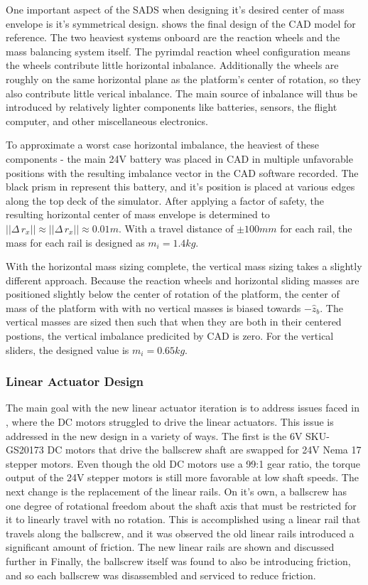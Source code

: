 One important aspect of the SADS when designing it's desired center of mass envelope is it's symmetrical design.  shows the final design of the CAD model for reference. The two heaviest systems onboard are the reaction wheels and the mass balancing system itself. The pyrimdal reaction wheel configuration means the wheels contribute little horizontal inbalance. Additionally the wheels are roughly on the same horizontal plane as the platform's center of rotation, so they also contribute little verical inbalance. The main source of inbalance will thus be introduced by relatively lighter components like batteries, sensors, the flight computer, and other miscellaneous electronics.

To approximate a worst case horizontal imbalance, the heaviest of these components - the main 24V battery was placed in CAD in multiple unfavorable positions with the resulting imbalance vector in the CAD software recorded. The black prism in  represent this battery, and it's position is placed at various edges along the top deck of the simulator. After applying a factor of safety, the resulting horizontal center of mass envelope is determined to $||\Delta\,r_x|| \approx ||\Delta\,r_x|| \approx 0.01m$. With a travel distance of $\pm100mm$ for each rail, the mass for each rail is designed as $m_i = 1.4kg$.

With the horizontal mass sizing complete, the vertical mass sizing takes a slightly different approach. Because the reaction wheels and horizontal sliding masses are positioned slightly below the center of rotation of the platform, the center of mass of the platform with with no vertical masses is biased towards $-\hat{z}_b$. The vertical masses are sized then such that when they are both in their centered postions, the vertical imbalance predicited by CAD is zero. For the vertical sliders, the designed value is $m_i = 0.65kg$. 

\subsubsection{Linear Actuator Design}

The main goal with the new linear actuator iteration is to address issues faced in \cite{gilman_automatic_2024}, where the DC motors struggled to drive the linear actuators. This issue is addressed in the new design in a variety of ways. The first is the 6V SKU-GS20173 DC motors that drive the ballscrew shaft are swapped for 24V Nema 17 stepper motors. Even though the old DC motors use a 99:1 gear ratio, the torque output of the 24V stepper motors is still more favorable at low shaft speeds. The next change is the replacement of the linear rails. On it's own, a ballscrew has one degree of rotational freedom about the shaft axis that must be restricted for it to linearly travel with no rotation. This is accomplished using a linear rail that travels along the ballscrew, and it was observed the old linear rails introduced a significant amount of friction. The new linear rails are shown and discussed further in  Finally, the ballscrew itself was found to also be introducing friction, and so each ballscrew was disassembled and serviced to reduce friction.

